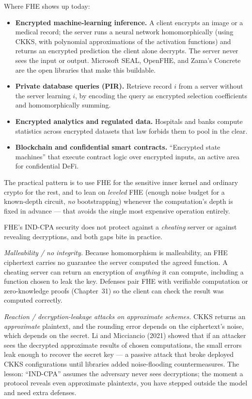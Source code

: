 \begin{applicationbox}
Where FHE shows up today:
\begin{itemize}
  \item \textbf{Encrypted machine-learning inference.} A client encrypts an image or a medical record; the server runs a neural network homomorphically (using CKKS, with polynomial approximations of the activation functions) and returns an encrypted prediction the client alone decrypts. The server never sees the input or output. Microsoft SEAL, OpenFHE, and Zama's Concrete are the open libraries that make this buildable.
  \item \textbf{Private database queries (PIR).} Retrieve record $i$ from a server without the server learning $i$, by encoding the query as encrypted selection coefficients and homomorphically summing.
  \item \textbf{Encrypted analytics and regulated data.} Hospitals and banks compute statistics across encrypted datasets that law forbids them to pool in the clear.
  \item \textbf{Blockchain and confidential smart contracts.} ``Encrypted state machines'' that execute contract logic over encrypted inputs, an active area for confidential DeFi.
\end{itemize}
The practical pattern is to use FHE for the sensitive inner kernel and ordinary crypto for the rest, and to lean on \emph{leveled} FHE (enough noise budget for a known-depth circuit, \emph{no} bootstrapping) whenever the computation's depth is fixed in advance --- that avoids the single most expensive operation entirely.
\end{applicationbox}

\begin{attackbox}
FHE's IND-CPA security does not protect against a \emph{cheating} server or against revealing decryptions, and both gaps bite in practice.

\emph{Malleability / no integrity.} Because homomorphism is malleability, an FHE ciphertext carries no guarantee the server computed the agreed function. A cheating server can return an encryption of \emph{anything} it can compute, including a function chosen to leak the key. Defenses pair FHE with verifiable computation or zero-knowledge proofs (Chapter~31) so the client can check the result was computed correctly.

\emph{Reaction / decryption-leakage attacks on approximate schemes.} CKKS returns an \emph{approximate} plaintext, and the rounding error depends on the ciphertext's noise, which depends on the secret. Li and Micciancio (2021) showed that if an attacker sees the decrypted approximate results of chosen computations, the small errors leak enough to recover the secret key --- a passive attack that broke deployed CKKS configurations until libraries added noise-flooding countermeasures. The lesson: ``IND-CPA'' assumes the adversary never sees decryptions; the moment a protocol reveals even approximate plaintexts, you have stepped outside the model and need extra defenses.
\end{attackbox}

